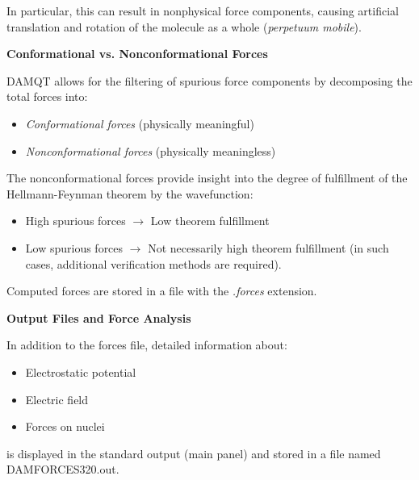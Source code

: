 \documentclass[10pt]{article}
\begin{document}
In particular, this can result in nonphysical force components,
causing artificial translation and rotation of the molecule as a whole ({\it perpetuum mobile}).


\vspace*{3mm}
{\bf Conformational vs. Nonconformational Forces}
\vspace*{3mm}

DAMQT allows for the filtering of spurious force components
by decomposing the total forces into:

\begin{itemize}
\item {\it Conformational forces} (physically meaningful)
\item {\it Nonconformational forces} (physically meaningless)
\end{itemize}

The nonconformational forces provide insight into the
degree of fulfillment of the Hellmann-Feynman theorem by the wavefunction:

\begin{itemize}
\item High spurious forces $\rightarrow$ Low theorem fulfillment
\item Low spurious forces $\rightarrow$ Not necessarily high theorem fulfillment
(in such cases, additional verification methods are required).
\end{itemize}

Computed forces are stored in a file with the {\it .forces} extension.

\newpage
{\bf Output Files and Force Analysis}
\vspace*{3mm}

In addition to the forces file, detailed information about:

\begin{itemize}
\item Electrostatic potential
\item Electric field
\item Forces on nuclei
\end{itemize}

is displayed in the standard output (main panel)
and stored in a file named DAMFORCES320.out.
\end{document}
